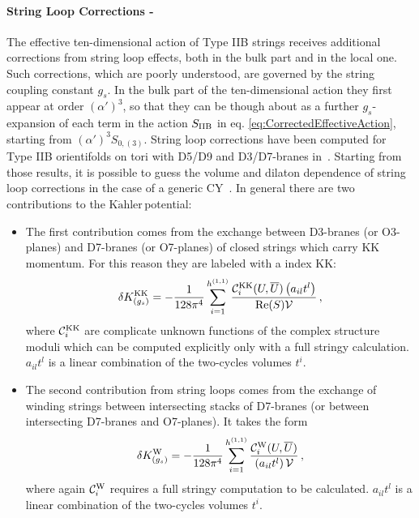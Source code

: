 \documentclass[12pt,a4paper]{book}
\newcommand{\Kahler}{\ensuremath{\text{K}\ddot{\text{a}}\text{hler}\,}}
\newcommand{\bi}{\begin{itemize}}
\newcommand{\ei}{\end{itemize}}
\newcommand{\V}{{\cal{V}}}
\begin{document}
\paragraph{String Loop Corrections - } The effective ten-dimensional action of Type IIB strings receives additional corrections from string loop effects, both in the bulk part and in the local one. Such corrections, which are poorly understood, are governed by the string coupling constant $g_s$. In the bulk part of the ten-dimensional action they first appear at order $\left(\alpha'\right)^3$, so that they can be though about as a further $g_s$-expansion of each term in the action $S_{\rm IIB}$ in eq. \eqref{eq:CorrectedEffectiveAction}, starting from $\left(\alpha'\right)^3 S_{0, (3)}$. String loop corrections have been computed for Type IIB orientifolds on tori with D5/D9 and D3/D7-branes in~\cite{Berg:2004ek, Berg:2005ja}. Starting from those results, it is possible to guess the volume and dilaton dependence of string loop corrections in the case of a generic CY~\cite{vonGersdorff:2005bf, Cicoli:2007xp, Cicoli:2008va, Berg:2007wt}. In general there are two contributions to the \Kahler potential:
\bi
\item The first contribution comes from the exchange between D3-branes (or O3-planes) and D7-branes (or O7-planes) of closed strings which carry KK momentum. For this reason they are labeled with a index KK:
\begin{align}
\label{eq:KKStringLoopCorrections}
\delta K^{\rm KK}_{(g_s)} = - \frac{1}{128 \pi^4} \sum_{i=1}^{h^{(1,1)}} \frac{\mathcal{C}_i^{\rm KK}(U, \overline{U}) \left(a_{il} t^l\right)}{\text{Re}(S) \V} \,,
\end{align}
where $\mathcal{C}_i^{\rm KK}$ are complicate unknown functions of the complex structure moduli which can be computed explicitly only with a full stringy calculation. $a_{il} t^l$ is a linear combination of the two-cycles volumes $t^i$.
\item The second contribution from string loops comes from the exchange of winding strings between intersecting stacks of D7-branes (or between intersecting D7-branes and O7-planes). It takes the form
\begin{align}
\label{eq:WindingStringLoopCorrections}
\delta K^{\rm W}_{(g_s)} = - \frac{1}{128 \pi^4} \sum_{i=1}^{h^{(1,1)}} \frac{\mathcal{C}_i^{\rm W}(U, \overline{U})}{\left(a_{il} t^l\right) \V} \,,
\end{align}
where again $\mathcal{C}_i^{\rm W}$ requires a full stringy computation to be calculated. $a_{il} t^l$ is a linear combination of the two-cycles volumes $t^i$. 
\ei
\end{document}
